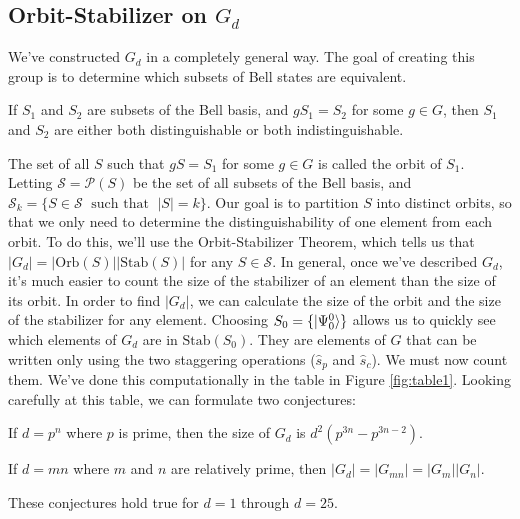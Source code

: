 \subsection{Orbit-Stabilizer on $G_d$}

We've constructed $G_d$ in a completely general way. The goal of creating this group is to determine which subsets of Bell states are equivalent. 
\begin{theorem}
  If $S_1$ and $S_2$ are subsets of the Bell basis, and $g S_1 = S_2$ for some $g \in G$, then $S_1$ and $S_2$ are either both distinguishable or both indistinguishable. 
\end{theorem}
The set of all $S$ such that $gS = S_1$ for some $g \in G$ is called the orbit of $S_1$. Letting $\mathcal{S} = \mathcal{P}(S)$ be the set of all subsets of the Bell basis, and $\mathcal{S}_k = \{S \in \mathcal{S} \; \text{ such that } \; |S| = k\}$. Our goal is to partition $S$ into distinct orbits, so that we only need to determine the distinguishability of one element from each orbit. To do this, we'll use the Orbit-Stabilizer Theorem, which tells us that $|G_d| = |\text{Orb}(S)| |\text{Stab}(S)|$ for any $S \in \mathcal{S}$. In general, once we've described $G_d$, it's much easier to count the size of the stabilizer of an element than the size of its orbit. In order to find $|G_d|$, we can calculate the size of the orbit and the size of the stabilizer for any element. Choosing $S_0 = \{| \Psi_0^0 \rangle\}$ allows us to quickly see which elements of $G_d$ are in $\text{Stab}(S_0)$. They are elements of $G$ that can be written only using the two staggering operations ($\hat{s}_p$ and $\hat{s}_c$). We must now count them. We've done this computationally in the table in Figure \ref{fig:table1}. Looking carefully at this table, we can formulate two conjectures:

\begin{conjecture}
  If $d = p^n$ where $p$ is prime, then the size of $G_d$ is $d^2(p^{3n} - p^{3n-2})$.
\end{conjecture}

\begin{conjecture}
  If $d = mn$ where $m$ and $n$ are relatively prime, then $|G_d| = |G_{mn}| = |G_m||G_n|$.
\end{conjecture}

These conjectures hold true for $d = 1$ through $d = 25$.

